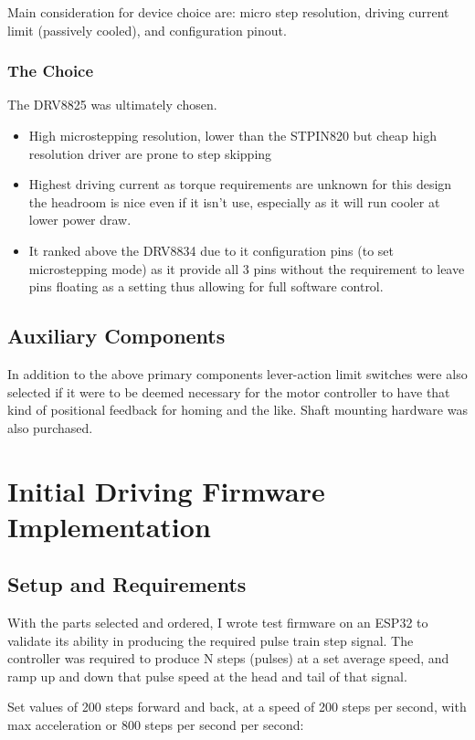 Main consideration for device choice are: micro step resolution, driving current limit (passively cooled), and configuration pinout.

\subsubsection*{The Choice}
The DRV8825 was ultimately chosen. 
\begin{itemize}
    \item High microstepping resolution, lower than the STPIN820 but cheap high resolution driver are prone to step skipping \cite{step_book}
    \item Highest driving current as torque requirements are unknown for this design the headroom is nice even if it isn't use, especially as it will run cooler at lower power draw. 
    \item It ranked above the DRV8834 due to it configuration pins (to set microstepping mode) as it provide all 3 pins without the requirement to leave pins floating as a setting thus allowing for full software control.
\end{itemize}

\subsection{Auxiliary Components}
In addition to the above primary components lever-action limit switches were also selected if it were to be deemed necessary for the motor controller to have that kind of positional feedback for homing and the like. Shaft mounting hardware was also purchased.

\newpage
\section{Initial Driving Firmware Implementation}
\subsection{Setup and Requirements}
With the parts selected and ordered, I wrote test firmware on an ESP32 to validate its ability in producing the required pulse train step signal. The controller was required to produce N steps (pulses) at a set average speed, and ramp up and down that pulse speed at the head and tail of that signal.

Set values of 200 steps forward and back, at a speed of 200 steps per second, with max acceleration or 800 steps per second per second:

